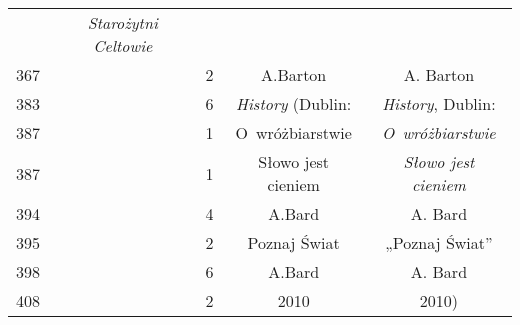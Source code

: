 \documentclass[a4paper,11pt]{article}
\numberwithin{equation}{section}
\begin{document}
\begin{center}
\begin{tabular}{|c|c|c|c|c|}
    & \textit{Starożytni Celtowie} \\
    367 & & \hphantom{0}2 & A.Barton & A. Barton \\
    383 & & \hphantom{0}6 & \textit{History} (Dublin:
    & \textit{History}, Dublin: \\
    387 & & \hphantom{0}1 & O~wróżbiarstwie & \textit{O~wróżbiarstwie} \\
    387 & & \hphantom{0}1 & Słowo jest cieniem
    & \textit{Słowo jest cieniem} \\
    394 & & \hphantom{0}4 & A.Bard & A. Bard \\
    395 & & \hphantom{0}2 & Poznaj Świat & „Poznaj Świat” \\
    398 & & \hphantom{0}6 & A.Bard & A. Bard \\
    408 & & \hphantom{0}2 & 2010 & 2010) \\
    \hline
  \end{tabular}





  \newpage


\end{center}
\end{document}
